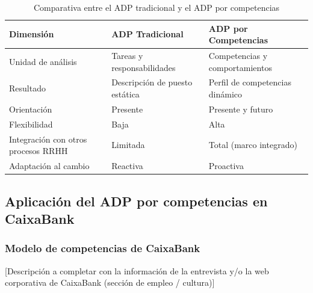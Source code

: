 \begin{table}[H]
  \centering
  \small
  \caption{Comparativa entre el ADP tradicional y el ADP por competencias}
  \begin{tabularx}{\textwidth}{p{} X X}
    \toprule
    \textbf{Dimensión}       & \textbf{ADP Tradicional} & \textbf{ADP por Competencias} \\
    \midrule
    Unidad de análisis       & Tareas y responsabilidades & Competencias y comportamientos \\
    Resultado                & Descripción de puesto estática & Perfil de competencias dinámico \\
    Orientación              & Presente                  & Presente y futuro \\
    Flexibilidad             & Baja                      & Alta \\
    Integración con otros procesos RRHH & Limitada   & Total (marco integrado) \\
    Adaptación al cambio     & Reactiva                  & Proactiva \\
    \bottomrule
  \end{tabularx}
\end{table}

\subsection{Aplicación del ADP por competencias en CaixaBank}


\subsubsection{Modelo de competencias de CaixaBank}

[Descripción a completar con la información de la entrevista y/o la
web corporativa de CaixaBank (sección de empleo / cultura)]

